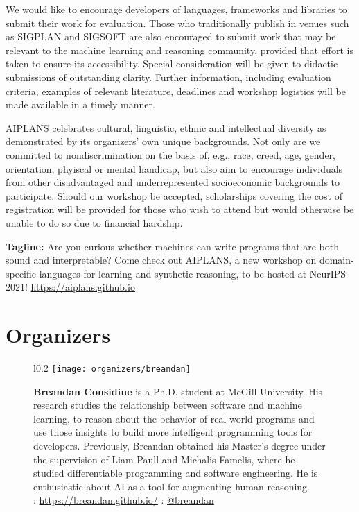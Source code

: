 \documentclass{article}
\begin{document}
    We would like to encourage developers of languages, frameworks and libraries to submit their work for evaluation. Those who traditionally publish in venues such as SIGPLAN and SIGSOFT are also encouraged to submit work that may be relevant to the machine learning and reasoning community, provided that effort is taken to ensure its accessibility. Special consideration will be given to didactic submissions of outstanding clarity. Further information, including evaluation criteria, examples of relevant literature, deadlines and workshop logistics will be made available in a timely manner.

    AIPLANS celebrates cultural, linguistic, ethnic and intellectual diversity as demonstrated by its organizers' own unique backgrounds. Not only are we committed to nondiscrimination on the basis of, e.g., race, creed, age, gender, orientation, phyiscal or mental handicap, but also aim to encourage individuals from other disadvantaged and underrepresented socioeconomic backgrounds to participate. Should our workshop be accepted, scholarships covering the cost of registration will be provided for those who wish to attend but would otherwise be unable to do so due to financial hardship.

    \textbf{Tagline:} Are you curious whether machines can write programs that are both sound and interpretable? Come check out AIPLANS, a new workshop on domain-specific languages for learning and synthetic reasoning, to be hosted at NeurIPS 2021! \url{https://aiplans.github.io}

    \newpage


    \section{Organizers}

    \begin{figure}[H]
        \begin{wrapfigure}{l}{0.2\textwidth}
            \texttt{[image: organizers/breandan]}
        \end{wrapfigure}
        \textbf{Breandan Considine} is a Ph.D. student at McGill University. His research studies the relationship between software and machine learning, to reason about the behavior of real-world programs and use those insights to build more intelligent programming tools for developers. Previously, Breandan obtained his  Master's degree under the supervision of Liam Paull and Michalis Famelis, where he studied differentiable programming and software engineering. He is enthusiastic about AI as a tool for augmenting human reasoning.\\
        \faHome: \url{https://breandan.github.io/} \faTwitter: \href{https://twitter.com/breandan}{@breandan}
    \end{figure}
\end{document}
